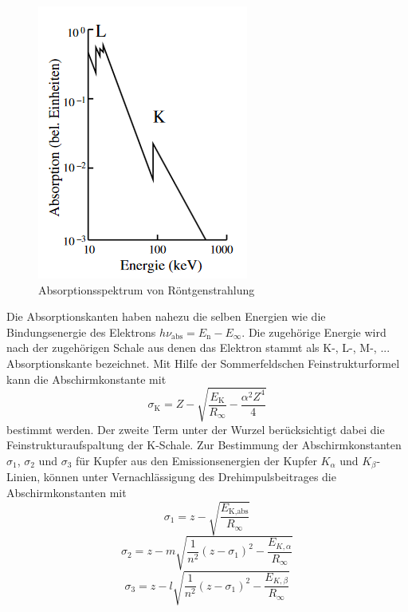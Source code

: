 \begin{figure}
    \centering
    \caption{Absorptionsspektrum von Röntgenstrahlung \cite{V602}}
    \label{fig:abso}
    \includegraphics[width = 0.6 \textwidth]{pics/abso.png}
\end{figure}
Die Absorptionskanten haben nahezu die selben Energien wie die Bindungsenergie des Elektrons $h \nu_\text{abs}= E_\text{n} - E_{\infty}$. Die zugehörige Energie wird nach der zugehörigen Schale aus denen das Elektron stammt als K-, L-, M-, ... Absorptionskante bezeichnet. 
Mit Hilfe der Sommerfeldschen Feinstrukturformel kann die Abschirmkonstante mit
\begin{equation}
    \sigma_\text{K}=Z-\sqrt{\frac{E_\text{K}}{R_{\infty}}-\frac{\alpha^2 Z^4}{4}}
    \label{eqn:abschirmkonstante}
\end{equation}
bestimmt werden. Der zweite Term unter der Wurzel berücksichtigt dabei die Feinstrukturaufspaltung der K-Schale.
Zur Bestimmung der Abschirmkonstanten $\sigma_1$, $\sigma_2$ und $\sigma_3$ für Kupfer aus den Emissionsenergien der Kupfer $K_\alpha$ und $K_\beta$-Linien, können unter Vernachlässigung des Drehimpulsbeitrages die Abschirmkonstanten mit
\begin{equation}
    \sigma_1=z-\sqrt{\frac{E_\text{K,abs}}{R_\infty}}
    \label{eqn:si1}
\end{equation}
\begin{equation}
    \sigma_2=z- m \sqrt{\frac{1}{n^2} (z- \sigma_1)^2-\frac{E_{K,\alpha}}{R_\infty}}
    \label{eqn:si2}
\end{equation}
\begin{equation}
    \sigma_3=z- l \sqrt{\frac{1}{n^2} (z- \sigma_1)^2-\frac{E_{K,\beta}}{R_\infty}}
    \label{eqn:si3}
\end{equation}
